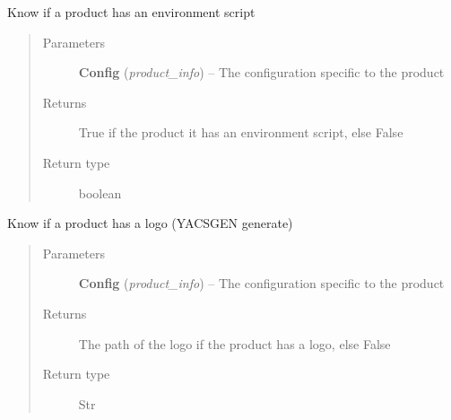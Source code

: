 \documentclass[a4paper,10pt,english]{sphinxmanual}
\begin{document}

\begin{fulllineitems}
\label{commands/apidoc/src:src.product.product_has_env_script}
Know if a product has an environment script
\begin{quote}\begin{description}
\item[{Parameters}] \leavevmode
\textbf{Config} (\emph{product\_info}) -- The configuration specific to 
the product

\item[{Returns}] \leavevmode
True if the product it has an environment script, else False

\item[{Return type}] \leavevmode
boolean

\end{description}\end{quote}

\end{fulllineitems}


\begin{fulllineitems}
\label{commands/apidoc/src:src.product.product_has_logo}
Know if a product has a logo (YACSGEN generate)
\begin{quote}\begin{description}
\item[{Parameters}] \leavevmode
\textbf{Config} (\emph{product\_info}) -- The configuration specific to 
the product

\item[{Returns}] \leavevmode
The path of the logo if the product has a logo, else False

\item[{Return type}] \leavevmode
Str

\end{description}\end{quote}

\end{fulllineitems}

\end{document}
